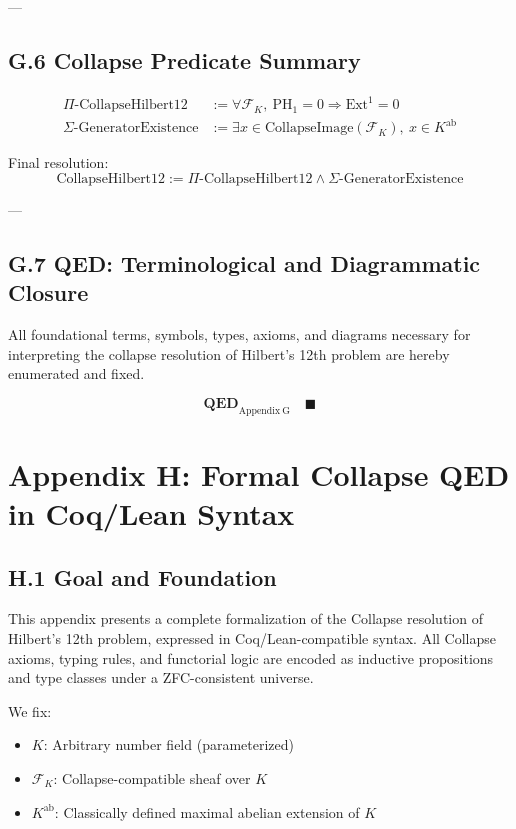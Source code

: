 \documentclass[11pt]{article}
\begin{document}
---

\subsection*{G.6 Collapse Predicate Summary}

\begin{align*}
\Pi\text{-CollapseHilbert12} &:= \forall \mathcal{F}_K,\ \mathrm{PH}_1 = 0 \Rightarrow \mathrm{Ext}^1 = 0 \\
\Sigma\text{-GeneratorExistence} &:= \exists x \in \text{CollapseImage}(\mathcal{F}_K),\ x \in K^{\mathrm{ab}}
\end{align*}

Final resolution:
\[
\text{CollapseHilbert12} := \Pi\text{-CollapseHilbert12} \wedge \Sigma\text{-GeneratorExistence}
\]

---

\subsection*{G.7 QED: Terminological and Diagrammatic Closure}

All foundational terms, symbols, types, axioms, and diagrams necessary for interpreting the collapse resolution of Hilbert's 12th problem are hereby enumerated and fixed.

\[
\textbf{QED}_{\mathrm{Appendix\ G}} \quad \blacksquare
\]



\appendix
\section*{Appendix H: Formal Collapse QED in Coq/Lean Syntax}

\subsection*{H.1 Goal and Foundation}

This appendix presents a complete formalization of the Collapse resolution of Hilbert's 12th problem, expressed in Coq/Lean-compatible syntax.  
All Collapse axioms, typing rules, and functorial logic are encoded as inductive propositions and type classes under a ZFC-consistent universe.

We fix:
\begin{itemize}
  \item \( K \): Arbitrary number field (parameterized)
  \item \( \mathcal{F}_K \): Collapse-compatible sheaf over \( K \)
  \item \( K^{\mathrm{ab}} \): Classically defined maximal abelian extension of \( K \)
\end{itemize}
\end{document}
